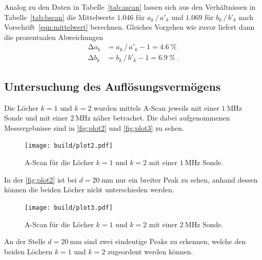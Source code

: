 Analog zu den Daten in Tabelle~\ref{tab:ascan} lassen sich aus den Verhältnissen in Tabelle~\ref{tab:bscan} die Mittelwerte $\num{1.046}$
für $a_k \, / \, a'_k$ und $\num{1.069}$ für $b_k \, / \, b'_k$ nach Vorschrift~\eqref{eqn:mittelwert} berechnen. Gleiches Vorgehen wie
zuvor liefert dann die prozentualen Abweichungen
\begin{align*}
	\increment a_k &= a_k \, / \, a'_k - 1 = \qty{4.6}{\percent} \\
	\increment b_k &= b_k \, / \, b'_k - 1 = \qty{6.9}{\percent} \: .
\end{align*}


\subsection{Untersuchung des Auflösungsvermögens} %
\label{sec:Untersuchung des Auslösungsverfahrens}

Die Löcher $k = 1$ und $k = 2$ wurden mittels A-Scan jeweils mit einer $\SI{1}{\mega\hertz}$ Sonde und mit einer
$\SI{2}{\mega\hertz}$ näher betrachet. Die dabei aufgenommenen Messergebnisse sind in \autoref{fig:plot2} und \autoref{fig:plot3}
zu sehen.

\begin{figure}[H]
	\texttt{[image: build/plot2.pdf]}
	\captionsetup{width=0.765\linewidth}
	\caption{A-Scan für die Löcher $k = 1$ und $k = 2$ mit einer $\SI{1}{\mega\hertz}$ Sonde.}
	\label{fig:plot2}
\end{figure}
In der \autoref{fig:plot2} ist bei $d = \SI{20}{\milli\meter}$ nur ein breiter Peak zu sehen, anhand dessen können die beiden Löcher nicht unterschieden werden.

\begin{figure}[H]
	\texttt{[image: build/plot3.pdf]}
	\captionsetup{width=0.765\linewidth}
	\caption{A-Scan für die Löcher $k = 1$ und $k = 2$ mit einer $\SI{2}{\mega\hertz}$ Sonde.}
	\label{fig:plot3}
\end{figure}
An der Stelle $d = \SI{20}{\milli\meter}$ sind zwei eindeutige Peaks zu erkennen, welche den beiden Löchern $k = 1$ und $k = 2$
zugeordent werden können.


